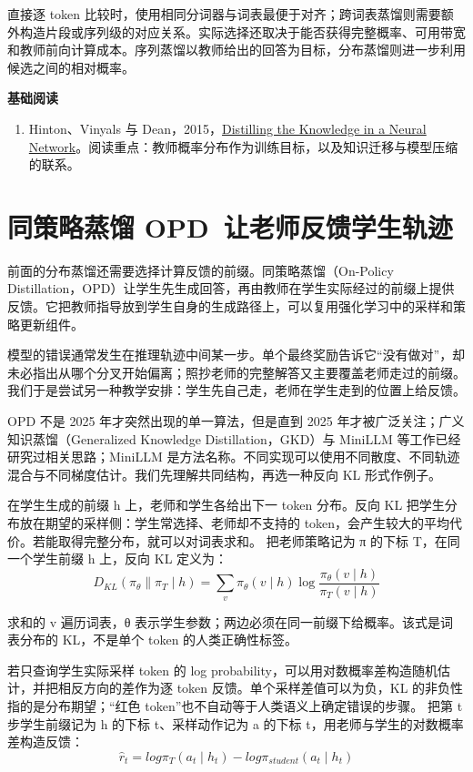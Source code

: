 直接逐 token 比较时，使用相同分词器与词表最便于对齐；跨词表蒸馏则需要额外构造片段或序列级的对应关系。实际选择还取决于能否获得完整概率、可用带宽和教师前向计算成本。序列蒸馏以教师给出的回答为目标，分布蒸馏则进一步利用候选之间的相对概率。

\textbf{基础阅读}
\begin{enumerate}
    \item Hinton、Vinyals 与 Dean，2015，\href{https://arxiv.org/abs/1503.02531}{Distilling the Knowledge in a Neural Network}。阅读重点：教师概率分布作为训练目标，以及知识迁移与模型压缩的联系。
\end{enumerate}

\section{同策略蒸馏 OPD~让老师反馈学生轨迹}\label{同策略蒸馏 OPD 让老师反馈学生轨迹}

前面的分布蒸馏还需要选择计算反馈的前缀。同策略蒸馏（On-Policy Distillation，OPD）让学生先生成回答，再由教师在学生实际经过的前缀上提供反馈。它把教师指导放到学生自身的生成路径上，可以复用强化学习中的采样和策略更新组件。

模型的错误通常发生在推理轨迹中间某一步。单个最终奖励告诉它``没有做对''，却未必指出从哪个分叉开始偏离；照抄老师的完整解答又主要覆盖老师走过的前缀。我们于是尝试另一种教学安排：学生先自己走，老师在学生走到的位置上给反馈。

OPD 不是 2025 年才突然出现的单一算法，但是直到 2025 年才被广泛关注；广义知识蒸馏（Generalized Knowledge Distillation，GKD）与 MiniLLM 等工作已经研究过相关思路；MiniLLM 是方法名称。不同实现可以使用不同散度、不同轨迹混合与不同梯度估计。我们先理解共同结构，再选一种反向 KL 形式作例子。

在学生生成的前缀 h 上，老师和学生各给出下一 token 分布。反向 KL 把学生分布放在期望的采样侧：学生常选择、老师却不支持的 token，会产生较大的平均代价。若能取得完整分布，就可以对词表求和。 把老师策略记为 π 的下标 T，在同一个学生前缀 h 上，反向 KL 定义为：
\[D_{KL}\left( \pi_{\theta}\|\pi_{T} \mid h \right) = \sum_{v}^{}\pi_{\theta}(v \mid h)\log\frac{\pi_{\theta}(v \mid h)}{\pi_{T}(v \mid h)}\]

求和的 v 遍历词表，θ 表示学生参数；两边必须在同一前缀下给概率。该式是词表分布的 KL，不是单个 token 的人类正确性标签。

若只查询学生实际采样 token 的 log probability，可以用对数概率差构造随机估计，并把相反方向的差作为逐 token 反馈。单个采样差值可以为负，KL 的非负性指的是分布期望；``红色 token''也不自动等于人类语义上确定错误的步骤。 把第 t 步学生前缀记为 h 的下标 t、采样动作记为 a 的下标 t，用老师与学生的对数概率差构造反馈：
\[{\widehat{r}}_{t} = log\pi_{T}\left( a_{t} \mid h_{t} \right) - log\pi_{student}\left( a_{t} \mid h_{t} \right)\]

